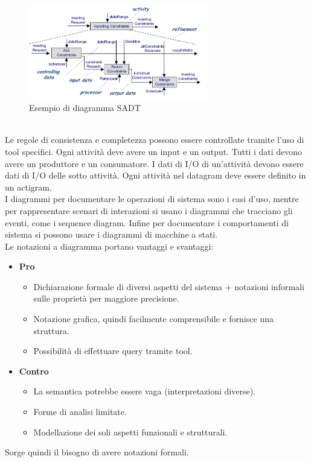 \documentclass[../main.tex]{subfiles}
\begin{document}
\begin{figure}[hbt]
	\centering
	\includegraphics[width=0.7\textwidth]{pictures/SADT.png}
	\caption{Esempio di diagramma SADT}
\end{figure}
\\
Le regole di consistenza e completezza possono essere controllate tramite l'uso di tool specifici. Ogni attività deve avere un input e un output.
Tutti i dati devono avere un produttore e un consumatore. I dati di I/O di un'attività devono essere dati di I/O delle sotto attività.
Ogni attività nel datagram deve essere definito in un actigram.
\\
I diagrammi per documentare le operazioni di sistema sono i casi d'uso, mentre per rappresentare scenari di interazioni si usano i diagrammi che tracciano gli eventi, come i sequence diagram.
Infine per documentare i comportamenti di sistema si possono usare i diagrammi di macchine a stati.\\
Le notazioni a diagramma portano vantaggi e svantaggi:
\begin{itemize}
	\item \textbf{Pro}
	\begin{itemize}
		\item Dichiarazione formale di diversi aspetti del sistema + notazioni informali sulle proprietà per maggiore precisione.
		\item Notazione grafica, quindi facilmente comprensibile e fornisce una struttura.
		\item Possibilità di effettuare query tramite tool.
	\end{itemize}
	\item \textbf{Contro}
	\begin{itemize}
		\item La semantica potrebbe essere vaga (interpretazioni diverse).
		\item Forme di analisi limitate.
		\item Modellazione dei soli aspetti funzionali e strutturali.
	\end{itemize}
\end{itemize}
Sorge quindi il bisogno di avere notazioni formali.
\end{document}
